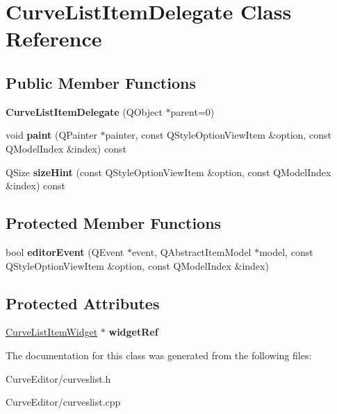 \hypertarget{class_curve_list_item_delegate}{
\section{\-Curve\-List\-Item\-Delegate \-Class \-Reference}
\label{class_curve_list_item_delegate}
}
\subsection*{\-Public \-Member \-Functions}
\begin{DoxyCompactItemize}
\item 
\hypertarget{class_curve_list_item_delegate_a98a9907b49818f48ba1d650ae4d3957d}{
{\bfseries \-Curve\-List\-Item\-Delegate} (\-Q\-Object $\ast$parent=0)}
\label{class_curve_list_item_delegate_a98a9907b49818f48ba1d650ae4d3957d}

\item 
\hypertarget{class_curve_list_item_delegate_a090be4547429ac9b3aa6c631b47527cb}{
void {\bfseries paint} (\-Q\-Painter $\ast$painter, const \-Q\-Style\-Option\-View\-Item \&option, const \-Q\-Model\-Index \&index) const }
\label{class_curve_list_item_delegate_a090be4547429ac9b3aa6c631b47527cb}

\item 
\hypertarget{class_curve_list_item_delegate_ae752e4dc776e13ddbdf03aad84b5327f}{
\-Q\-Size {\bfseries size\-Hint} (const \-Q\-Style\-Option\-View\-Item \&option, const \-Q\-Model\-Index \&index) const }
\label{class_curve_list_item_delegate_ae752e4dc776e13ddbdf03aad84b5327f}

\end{DoxyCompactItemize}
\subsection*{\-Protected \-Member \-Functions}
\begin{DoxyCompactItemize}
\item 
\hypertarget{class_curve_list_item_delegate_a8ad8815d6b9be96fc3171ade82306b86}{
bool {\bfseries editor\-Event} (\-Q\-Event $\ast$event, \-Q\-Abstract\-Item\-Model $\ast$model, const \-Q\-Style\-Option\-View\-Item \&option, const \-Q\-Model\-Index \&index)}
\label{class_curve_list_item_delegate_a8ad8815d6b9be96fc3171ade82306b86}

\end{DoxyCompactItemize}
\subsection*{\-Protected \-Attributes}
\begin{DoxyCompactItemize}
\item 
\hypertarget{class_curve_list_item_delegate_afb8fc694c61e8b3b9d367f2ab31e0df4}{
\hyperlink{class_curve_list_item_widget}{\-Curve\-List\-Item\-Widget} $\ast$ {\bfseries widget\-Ref}}
\label{class_curve_list_item_delegate_afb8fc694c61e8b3b9d367f2ab31e0df4}

\end{DoxyCompactItemize}


\-The documentation for this class was generated from the following files\-:\begin{DoxyCompactItemize}
\item 
\-Curve\-Editor/curveslist.\-h\item 
\-Curve\-Editor/curveslist.\-cpp\end{DoxyCompactItemize}

